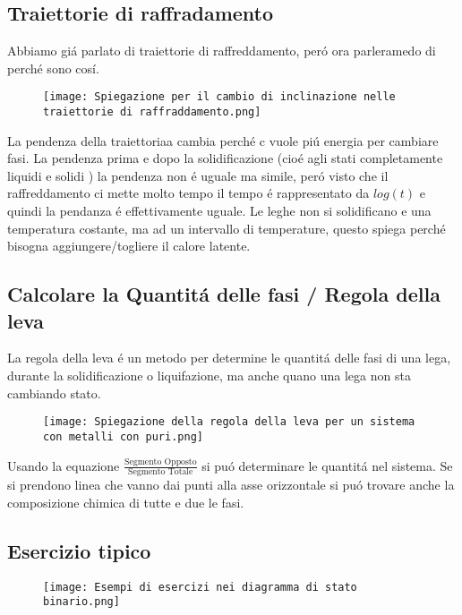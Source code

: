 \documentclass{article}
\begin{document}
{        \subsection{Traiettorie di raffradamento}
            Abbiamo gi\'a parlato di traiettorie di raffreddamento, per\'o ora parleramedo di perch\'e sono cos\'i.
            \begin{figure}[!h]
                \centering
                \texttt{[image: Spiegazione per il cambio di inclinazione nelle traiettorie di raffraddamento.png]}
            \end{figure}
            La pendenza della traiettoriaa cambia perch\'e c vuole pi\'u energia per cambiare fasi. La pendenza prima e dopo la solidificazione (cio\'e agli stati completamente liquidi e solidi ) la pendenza non \'e uguale ma simile, per\'o visto che il raffreddamento ci mette molto tempo il tempo \'e rappresentato da $log(t)$ e quindi la pendanza \'e effettivamente uguale. Le leghe non si solidificano e una temperatura costante, ma ad un intervallo di temperature, questo spiega perch\'e bisogna aggiungere/togliere il calore latente.
        \subsection{Calcolare la Quantit\'a delle fasi / Regola della leva}
            La regola della leva \'e un metodo per determine le quantit\'a delle fasi di una lega, durante la solidificazione o liquifazione, ma anche quano una lega non sta cambiando stato.
            \newpage
            \begin{figure}[!h]
                \centering
                \texttt{[image: Spiegazione della regola della leva per un sistema con metalli con puri.png]}
            \end{figure}
            Usando la equazione $\frac{\text{Segmento Opposto}}{\text{Segmento Totale}}$ si pu\'o determinare le quantit\'a nel sistema. Se si prendono linea che vanno dai punti alla asse orizzontale si pu\'o trovare anche la composizione chimica di tutte e due le fasi.
        \subsection{Esercizio tipico}
            \begin{figure}[!h]
                \centering
                \texttt{[image: Esempi di esercizi nei diagramma di stato binario.png]}
            \end{figure}
        \newpage
}
\end{document}
